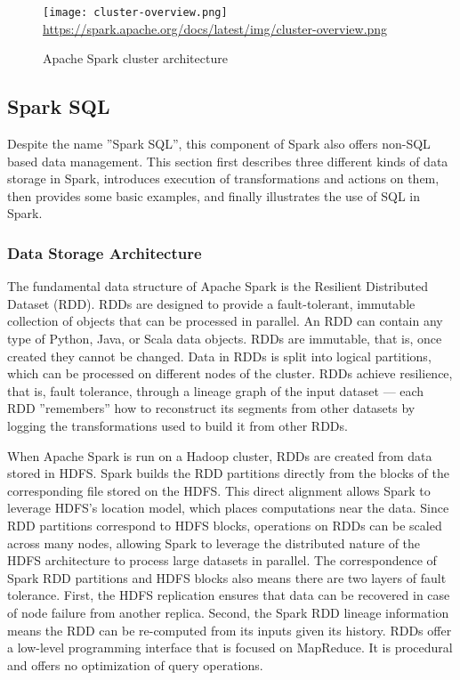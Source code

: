 \begin{figure}
\centering

\texttt{[image: cluster-overview.png]}
\scriptsize \url{https://spark.apache.org/docs/latest/img/cluster-overview.png}
\caption{Apache Spark cluster architecture}
\label{fig:sparkcluster}
\end{figure}

\subsection{Spark SQL}

Despite the name ''Spark SQL'', this component of Spark also offers non-SQL based data management. This section first describes three different kinds of data storage in Spark, introduces execution of transformations and actions on them, then provides some basic examples, and finally illustrates the use of SQL in Spark.

\subsubsection*{Data Storage Architecture}

The fundamental data structure of Apache Spark is the Resilient Distributed Dataset (RDD). RDDs are designed to provide a fault-tolerant, immutable collection of objects that can be processed in parallel. An RDD can contain any type of Python, Java, or Scala data objects. RDDs are immutable, that is, once created they cannot be changed. Data in RDDs is split into logical partitions, which can be processed on different nodes of the cluster. RDDs achieve resilience, that is, fault tolerance, through a lineage graph of the input dataset --- each RDD ''remembers'' how to reconstruct its segments from other datasets by logging the transformations used to build it from other RDDs.

When Apache Spark is run on a Hadoop cluster, RDDs are created from data stored in HDFS. Spark builds the RDD partitions directly from the blocks of the corresponding file stored on the HDFS. This direct alignment allows Spark to leverage HDFS's location model, which places computations near the data. Since RDD partitions correspond to HDFS blocks, operations on RDDs can be scaled across many nodes, allowing Spark to leverage the distributed nature of the HDFS architecture to process large datasets in parallel. The correspondence of Spark RDD partitions and HDFS blocks also means there are two layers of fault tolerance. First, the HDFS replication ensures that data can be recovered in case of node failure from another replica. Second, the Spark RDD lineage information means the RDD can be re-computed from its inputs given its history. RDDs offer a low-level programming interface that is focused on MapReduce. It is procedural and offers no optimization of query operations. 

